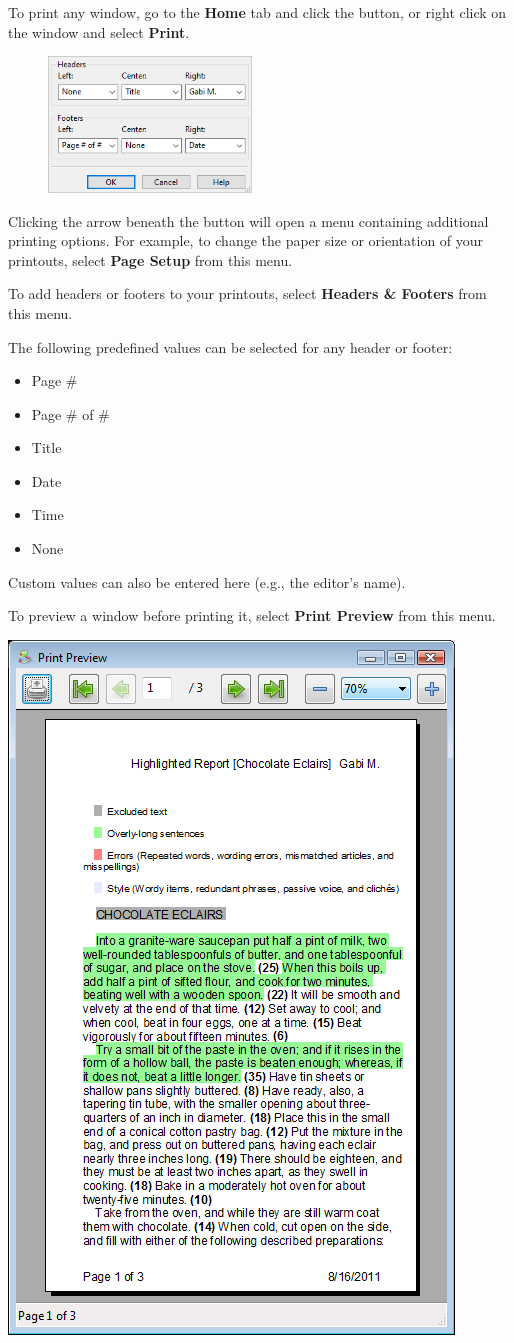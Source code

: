 \documentclass[
]{book}
\providecommand{\tightlist}{%
  \setlength{\itemsep}{0pt}\setlength{\parskip}{0pt}}
\theoremstyle{definition}
\theoremstyle{definition}
\theoremstyle{definition}
\theoremstyle{definition}
\theoremstyle{remark}
\begin{document}
To print any window, go to the \textbf{Home} tab and click the  button, or right click on the window and select \textbf{Print}.

\begin{figure}
\includegraphics[width=0.48\textwidth,height=\textheight]{Images/printerheadersfooters.png}

\end{figure}

Clicking the arrow beneath the  button will open a menu containing additional printing options. For example, to change the paper size or orientation of your printouts, select \textbf{Page Setup} from this menu.

To add headers or footers to your printouts, select \textbf{Headers \& Footers} from this menu.

The following predefined values can be selected for any header or footer:

\begin{itemize}
\tightlist
\item
  Page \#
\item
  Page \# of \#
\item
  Title
\item
  Date
\item
  Time
\item
  None
\end{itemize}

Custom values can also be entered here (e.g., the editor's name).

To preview a window before printing it, select \textbf{Print Preview} from this menu.

\begin{center}\includegraphics[width=0.5\linewidth,]{Images/NonGenerated/printpreview} \end{center}
\end{document}
